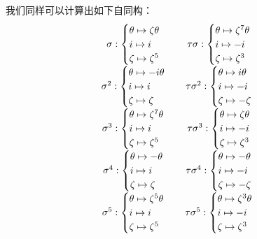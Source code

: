 我们同样可以计算出如下自同构：
\[
\begin{array}{c@{\quad}c}
\sigma:\begin{cases}\theta\mapsto\zeta\theta\\ i\mapsto i\\ \zeta\mapsto\zeta^5\end{cases}
&
\tau\sigma:\begin{cases}\theta\mapsto\zeta^7\theta\\ i\mapsto -i\\ \zeta\mapsto\zeta^3\end{cases}\\[5mm]
\sigma^2:\begin{cases}\theta\mapsto -i\theta\\ i\mapsto i\\ \zeta\mapsto\zeta\end{cases}
&
\tau\sigma^2:\begin{cases}\theta\mapsto i\theta\\ i\mapsto -i\\ \zeta\mapsto -\zeta\end{cases}\\[5mm]
\sigma^3:\begin{cases}\theta\mapsto\zeta^7\theta\\ i\mapsto i\\ \zeta\mapsto\zeta^5\end{cases}
&
\tau\sigma^3:\begin{cases}\theta\mapsto\zeta\theta\\ i\mapsto -i\\ \zeta\mapsto\zeta^3\end{cases}\\[5mm]
\sigma^4:\begin{cases}\theta\mapsto-\theta\\ i\mapsto i\\ \zeta\mapsto\zeta\end{cases}
&
\tau\sigma^4:\begin{cases}\theta\mapsto-\theta\\ i\mapsto -i\\ \zeta\mapsto-\zeta\end{cases}\\[5mm]
\sigma^5:\begin{cases}\theta\mapsto\zeta^5\theta\\ i\mapsto i\\ \zeta\mapsto\zeta^5\end{cases}
&
\tau\sigma^5:\begin{cases}\theta\mapsto\zeta^3\theta\\ i\mapsto -i\\ \zeta\mapsto\zeta^3\end{cases}\\[5mm]

\end{array}\]
